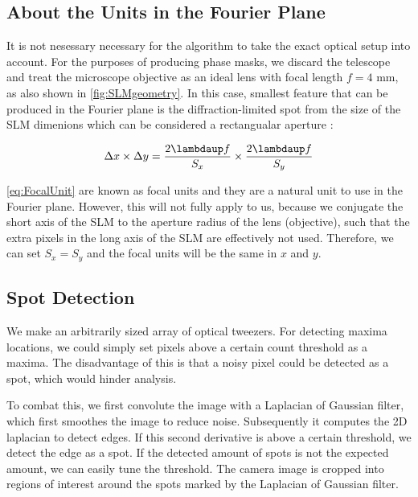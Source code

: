\begin{mdframed}
    \subsection*{About the Units in the Fourier Plane}
    
    It is not nesessary necessary for the algorithm to take the exact optical setup into account.
    For the purposes of producing phase masks, we discard the telescope and treat the microscope objective as an ideal lens with focal length $f = 4$ mm, as also shown in \cref{fig:SLMgeometry}.
    In this case, smallest feature that can be produced in the Fourier plane is the diffraction-limited spot from the size of the SLM dimenions which can be considered a rectangualar aperture \cite{Bijnen2013,Bijnen2015}:
    
    \begin{equation}\label{eq:FocalUnit}
        \Delta x \times \Delta y = \frac{2\lambdaup f}{S_x} \times \frac{2 \lambdaup f}{S_y}
    \end{equation}
    
    \cref{eq:FocalUnit} are known as focal units and they are a natural unit to use in the Fourier plane.
    However, this will not fully apply to us, because we conjugate the short axis of the SLM to the aperture radius of the lens (objective), such that the extra pixels in the long axis of the SLM are effectively not used. 
    Therefore, we can set $S_x = S_y$ and the focal units will be the same in $x$ and $y$.
\end{mdframed}
    



\subsection{Spot Detection}

We make an arbitrarily sized array of optical tweezers. For detecting maxima locations, we could simply set pixels above a certain count threshold as a maxima. The disadvantage of this is that a noisy pixel could be detected as a spot, which would hinder analysis. 

To combat this, we first convolute the image with a Laplacian of Gaussian filter, which first smoothes the image to reduce noise. Subsequently it computes the 2D laplacian to detect edges. If this second derivative is above a certain threshold, we detect the edge as a spot. If the detected amount of spots is not the expected amount, we can easily tune the threshold. The camera image is cropped into regions of interest around the spots marked by the Laplacian of Gaussian filter. 

